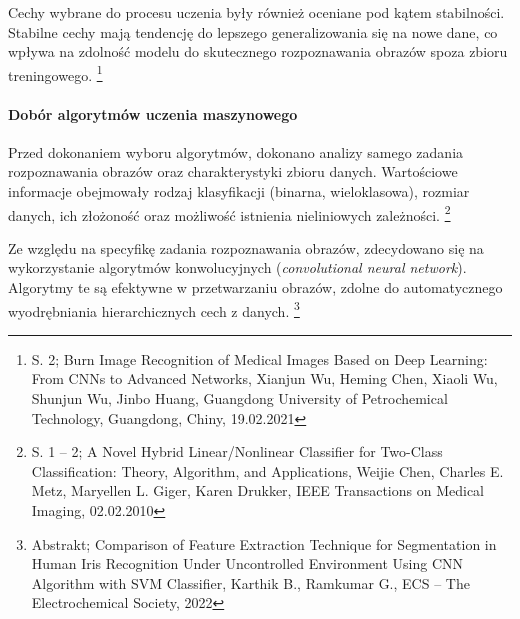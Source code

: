 \documentclass[12pt, a4paper, twoside, openany]{book}
\newcommand{\forceindent}{\leavevmode{\parindent=1.3em\indent}}
\begin{document}
{%
Cechy wybrane do procesu uczenia były również oceniane pod kątem stabilności. Stabilne cechy mają tendencję do lepszego generalizowania się na nowe dane, co wpływa na zdolność modelu do skutecznego rozpoznawania obrazów spoza zbioru treningowego. \footnote{ S. 2; Burn Image Recognition of Medical Images Based on Deep Learning: From CNNs to Advanced Networks, Xianjun Wu, Heming Chen, Xiaoli Wu, Shunjun Wu, Jinbo Huang, Guangdong University of Petrochemical Technology, Guangdong, Chiny, 19.02.2021}

\paragraph{Dobór algorytmów uczenia maszynowego\\}
\forceindent Przed dokonaniem wyboru algorytmów, dokonano analizy samego zadania rozpoznawania obrazów oraz charakterystyki zbioru danych.
Wartościowe informacje obejmowały rodzaj klasyfikacji (binarna, wieloklasowa), rozmiar danych, ich złożoność oraz możliwość istnienia nieliniowych zależności. \footnote{ S. 1 -- 2; A Novel Hybrid Linear/Nonlinear Classifier for Two-Class Classification: Theory, Algorithm, and Applications, Weijie Chen, Charles E. Metz, Maryellen L. Giger, Karen Drukker, IEEE Transactions on Medical Imaging, 02.02.2010}

Ze względu na specyfikę zadania rozpoznawania obrazów, zdecydowano się na wykorzystanie algorytmów konwolucyjnych (\textit{convolutional neural network}).
Algorytmy te są efektywne w przetwarzaniu obrazów, zdolne do automatycznego wyodrębniania hierarchicznych cech z danych. \footnote{Abstrakt; Comparison of Feature Extraction Technique for Segmentation in Human Iris Recognition Under Uncontrolled Environment Using CNN Algorithm with SVM Classifier, Karthik B., Ramkumar G., ECS -- The Electrochemical Society, 2022}

}
\end{document}
